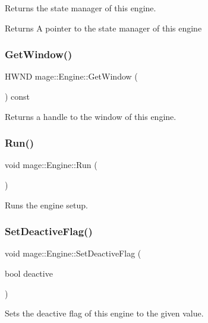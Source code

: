 Returns the state manager of this engine.

\begin{DoxyReturn}{Returns}
A pointer to the state manager of this engine 
\end{DoxyReturn}
\hypertarget{classmage_1_1_engine_a1c5f9d8c68045b36f404251359aa41e4}{}\label{classmage_1_1_engine_a1c5f9d8c68045b36f404251359aa41e4} 
\subsubsection{\texorpdfstring{Get\+Window()}{GetWindow()}}
{\footnotesize\ttfamily H\+W\+ND mage\+::\+Engine\+::\+Get\+Window (\begin{DoxyParamCaption}{ }\end{DoxyParamCaption}) const}

Returns a handle to the window of this engine. \hypertarget{classmage_1_1_engine_afdc05e214d3f47a6ea3a40dfffd86f80}{}\label{classmage_1_1_engine_afdc05e214d3f47a6ea3a40dfffd86f80} 
\subsubsection{\texorpdfstring{Run()}{Run()}}
{\footnotesize\ttfamily void mage\+::\+Engine\+::\+Run (\begin{DoxyParamCaption}{ }\end{DoxyParamCaption})}

Runs the engine setup. \hypertarget{classmage_1_1_engine_a942bfa9892fa79bb1068d7c7ec4e6732}{}\label{classmage_1_1_engine_a942bfa9892fa79bb1068d7c7ec4e6732} 
\subsubsection{\texorpdfstring{Set\+Deactive\+Flag()}{SetDeactiveFlag()}}
{\footnotesize\ttfamily void mage\+::\+Engine\+::\+Set\+Deactive\+Flag (\begin{DoxyParamCaption}\item[{bool}]{deactive }\end{DoxyParamCaption})}

Sets the deactive flag of this engine to the given value.


